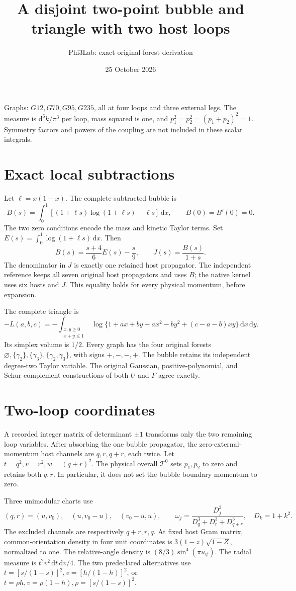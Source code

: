 \documentclass[11pt]{article}
\title{A disjoint two-point bubble and triangle with two host loops}
\author{Phi3Lab: exact original-forest derivation}
\date{25 October 2026}
\newcommand{\dd}{\mathrm d}
\newcommand{\T}{\mathcal T}
\begin{document}
\maketitle
\noindent Graphs: \(G12,G70,G95,G235\), all at four loops and three
external legs. The measure is \(\dd^6k/\pi^3\) per loop, mass squared
is one, and \(p_1^2=p_2^2=(p_1+p_2)^2=1\).
Symmetry factors and powers of the coupling are not included in these
scalar integrals.

\section*{Exact local subtractions}
Let \(\ell=x(1-x)\). The complete subtracted bubble is
\[
 B(s)=\int_0^1[(1+\ell s)\log(1+\ell s)-\ell s]\,\dd x,
 \qquad B(0)=B'(0)=0.
\]
The two zero conditions encode the mass and kinetic Taylor terms.
Set \(E(s)=\int_0^1\log(1+\ell s)\,\dd x\). Then
\[
 B(s)=\frac{s+4}{6}E(s)-\frac{s}{9},\qquad
 J(s)=\frac{B(s)}{1+s}.
\]
The denominator in \(J\) is exactly one retained host propagator.
The independent reference keeps all seven original host propagators
and uses \(B\); the native kernel uses six hosts and \(J\).
This equality holds for every physical momentum, before expansion.

The complete triangle is
\[
 -L(a,b,c)=-\int_{\substack{x,y\geq0\\x+y\leq1}}
 \log\{1+ax+by-ax^2-by^2+(c-a-b)xy\}\,\dd x\,\dd y .
\]
Its simplex volume is \(1/2\). Every graph has the four original
forests \(\varnothing,\{\gamma_2\},\{\gamma_3\},\{\gamma_2,\gamma_3\}\),
with signs \(+,-,-,+\). The bubble retains its independent degree-two
Taylor variable. The original Gaussian, positive-polynomial, and
Schur-complement constructions of both \(U\) and \(F\) agree exactly.

\section*{Two-loop coordinates}
A recorded integer matrix of determinant \(\pm1\) transforms only the
two remaining loop variables. After absorbing the one bubble
propagator, the zero-external-momentum host channels are \(q,r,q+r\),
each twice. Let \(t=q^2,v=r^2,w=(q+r)^2\).
The physical overall \(\T^0\) sets \(p_1,p_2\) to zero and retains
both \(q,r\). In particular, it does not set the bubble boundary
momentum to zero.

Three unimodular charts use
\[
 (q,r)=(u,v_0),\quad (u,v_0-u),\quad (v_0-u,u),
 \qquad
 \omega_j=\frac{D_j^3}{D_q^3+D_r^3+D_{q+r}^3},\quad D_k=1+k^2 .
\]
The excluded channels are respectively \(q+r,r,q\).
At fixed host Gram matrix, common-orientation density in four unit
coordinates is \(3(1-z)\sqrt{1-Z}\), normalized to one.
The relative-angle density is \((8/3)\sin^4(\pi u_\psi)\).
The radial measure is \(t^2v^2\,\dd t\,\dd v/4\).
The two predeclared alternatives use
\(t=[s/(1-s)]^2,v=[h/(1-h)]^2\), or
\(t=\rho h,v=\rho(1-h),\rho=[s/(1-s)]^2\).
\end{document}
